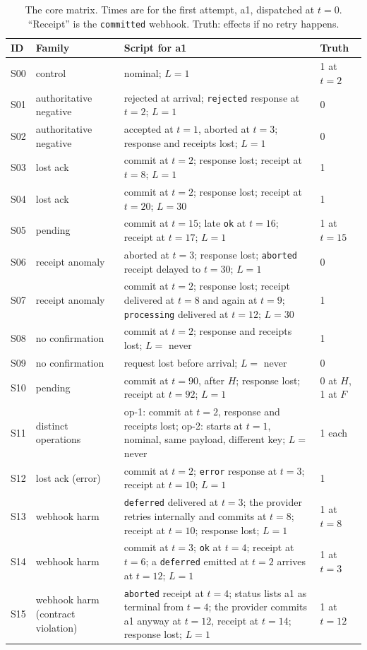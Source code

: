 \documentclass[11pt]{article}
\newcommand{\code}[1]{\texttt{#1}}
\begin{document}
\begin{table}[!htbp]
\centering
\footnotesize
\caption{The core matrix. Times are for the first attempt, a1, dispatched at $t=0$. ``Receipt'' is the \code{committed} webhook. Truth: effects if no retry happens.}
\label{tab:scenarios}
\begin{tabular}{@{}lL{2.6cm}L{10.0cm}L{1.9cm}@{}}
\toprule
ID & Family & Script for a1 & Truth \\
\midrule
S00 & control & nominal; $L=1$ & 1 at $t=2$ \\
S01 & authoritative negative & rejected at arrival; \code{rejected} response at $t=2$; $L=1$ & 0 \\
S02 & authoritative negative & accepted at $t=1$, aborted at $t=3$; response and receipts lost; $L=1$ & 0 \\
S03 & lost ack & commit at $t=2$; response lost; receipt at $t=8$; $L=1$ & 1 \\
S04 & lost ack & commit at $t=2$; response lost; receipt at $t=20$; $L=30$ & 1 \\
S05 & pending & commit at $t=15$; late \code{ok} at $t=16$; receipt at $t=17$; $L=1$ & 1 at $t=15$ \\
S06 & receipt anomaly & aborted at $t=3$; response lost; \code{aborted} receipt delayed to $t=30$; $L=1$ & 0 \\
S07 & receipt anomaly & commit at $t=2$; response lost; receipt delivered at $t=8$ and again at $t=9$; \code{processing} delivered at $t=12$; $L=30$ & 1 \\
S08 & no confirmation & commit at $t=2$; response and receipts lost; $L=$ never & 1 \\
S09 & no confirmation & request lost before arrival; $L=$ never & 0 \\
S10 & pending & commit at $t=90$, after $H$; response lost; receipt at $t=92$; $L=1$ & 0 at $H$, 1 at $F$ \\
S11 & distinct operations & op-1: commit at $t=2$, response and receipts lost; op-2: starts at $t=1$, nominal, same payload, different key; $L=$ never & 1 each \\
S12 & lost ack (error) & commit at $t=2$; \code{error} response at $t=3$; receipt at $t=10$; $L=1$ & 1 \\
S13 & webhook harm & \code{deferred} delivered at $t=3$; the provider retries internally and commits at $t=8$; receipt at $t=10$; response lost; $L=1$ & 1 at $t=8$ \\
S14 & webhook harm & commit at $t=3$; \code{ok} at $t=4$; receipt at $t=6$; a \code{deferred} emitted at $t=2$ arrives at $t=12$; $L=1$ & 1 at $t=3$ \\
S15 & webhook harm (contract violation) & \code{aborted} receipt at $t=4$; status lists a1 as terminal from $t=4$; the provider commits a1 anyway at $t=12$, receipt at $t=14$; response lost; $L=1$ & 1 at $t=12$ \\
\bottomrule
\end{tabular}
\end{table}
\end{document}
